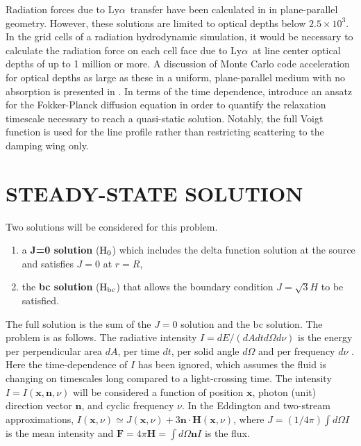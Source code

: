 \documentclass{aastex63}
\renewcommand{\vec}[1]{\mathbf{#1}}
\newcommand\lya{Ly$\alpha$\ }
\begin{document}
Radiation forces due to \lya transfer have been calculated in \citet{1976ApJ...208..286W} in plane-parallel geometry. However, these solutions are limited to optical depths below $2.5 \times 10^3$. In the grid cells of a radiation hydrodynamic simulation, it would be necessary to calculate the radiation force on each cell face due to \lya at line center optical depths of up to 1 million or more. A discussion of Monte Carlo code acceleration for optical depths as large as these in a uniform, plane-parallel medium with no absorption is presented in  \citet{2002ApJ...567..922A,2015MNRAS.449.4336S}. In terms of the time dependence, \citet{1994ApJ...427..603R} introduce an ansatz for the Fokker-Planck diffusion equation in order to quantify the relaxation timescale necessary to reach a quasi-static solution. Notably, the full Voigt function is used for the line profile rather than restricting scattering to the damping wing only.


\section{STEADY-STATE SOLUTION}
\label{sec:steadystate}

Two solutions will be considered for this problem.

\begin{enumerate}
    \item a \textbf{J=0 solution} ($\rm H_0$) which includes the delta function solution at the source and satisfies $J=0$ at $r=R$,
    \item the \textbf{bc solution} ($\rm H_{bc}$) that allows the boundary condition $J=\sqrt{3}H$ to be satisfied.
\end{enumerate}

\noindent The full solution is the sum of the $J=0$ solution and the bc solution. The problem is as follows. The radiative intensity $I = dE/(dA dt d\Omega d\nu)$ is the energy per perpendicular area $dA$, per time $dt$, per solid angle $d\Omega$ and per frequency $d\nu$ \citep{1986rpa..book.....R}. Here the time-dependence of $I$ has been ignored, which assumes the fluid is changing on timescales long compared to a light-crossing time. The intensity $I=I(\vec{x},\vec{n}, \nu)$ will be considered a function of position $\vec{x}$, photon (unit) direction vector $\vec{n}$, and cyclic frequency $\nu$. In the Eddington and two-stream approximations, $I(\vec{x},\nu) \simeq J(\vec{x},\nu) + 3 \vec{n} \cdot \vec{H}(\vec{x},\nu)$, where $J=(1/4\pi) \int d\Omega I$ is the mean intensity and $\vec{F} = 4\pi \vec{H}= \int d\Omega \vec{n} I$ is the flux.  
\end{document}
